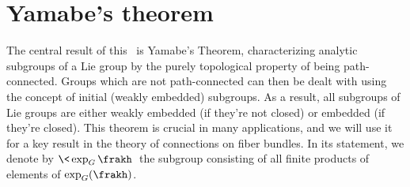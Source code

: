 




\section{Yamabe's theorem}\label{sec: Yamabe's theorem}

The central result of this \sect\ is Yamabe's Theorem, characterizing analytic subgroups of a Lie group by the purely topological property of being path-connected. Groups which are not path-connected can then be dealt with using the concept of initial (weakly embedded) subgroups. As a result, all subgroups of Lie groups are either weakly embedded (if they're not closed) or embedded (if they're closed). This theorem is crucial in many applications, and we will use it for a key result in the theory of connections on fiber bundles. In its statement, we denote by $\<\exp_G \frakh\>$ the subgroup consisting of all finite products of elements of $\exp_G(\frakh)$.


